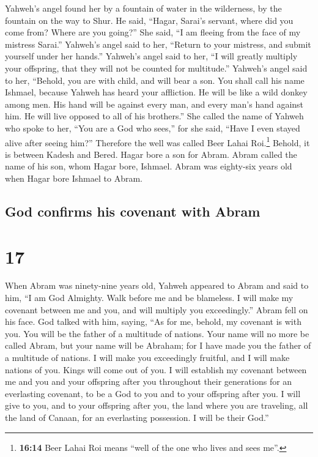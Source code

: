  Yahweh's angel found her by a fountain of water in the
wilderness, by the fountain on the way to Shur.  He said,
``Hagar, Sarai's servant, where did you come from? Where are you
going?'' She said, ``I am fleeing from the face of my mistress Sarai.''
 Yahweh's angel said to her, ``Return to your mistress,
and submit yourself under her hands.''  Yahweh's angel
said to her, ``I will greatly multiply your offspring, that they will
not be counted for multitude.''  Yahweh's angel said to
her, ``Behold, you are with child, and will bear a son. You shall call
his name Ishmael, because Yahweh has heard your affliction.
 He will be like a wild donkey among men. His hand will
be against every man, and every man's hand against him. He will live
opposed to all of his brothers.''  She called the name of
Yahweh who spoke to her, ``You are a God who sees,'' for she said,
``Have I even stayed alive after seeing him?''  Therefore
the well was called Beer Lahai Roi.\footnote{\textbf{16:14} Beer Lahai
  Roi means ``well of the one who lives and sees me''.} Behold, it is
between Kadesh and Bered.  Hagar bore a son for Abram.
Abram called the name of his son, whom Hagar bore, Ishmael.
 Abram was eighty-six years old when Hagar bore Ishmael
to Abram.

\hypertarget{god-confirms-his-covenant-with-abram}{%
\subsection{God confirms his covenant with
Abram}\label{god-confirms-his-covenant-with-abram}}

\hypertarget{section-16}{%
\section{17}\label{section-16}}

 When Abram was ninety-nine years old, Yahweh appeared to
Abram and said to him, ``I am God Almighty. Walk before me and be
blameless.  I will make my covenant between me and you,
and will multiply you exceedingly.''  Abram fell on his
face. God talked with him, saying,  ``As for me, behold,
my covenant is with you. You will be the father of a multitude of
nations.  Your name will no more be called Abram, but your
name will be Abraham; for I have made you the father of a multitude of
nations.  I will make you exceedingly fruitful, and I will
make nations of you. Kings will come out of you.  I will
establish my covenant between me and you and your offspring after you
throughout their generations for an everlasting covenant, to be a God to
you and to your offspring after you.  I will give to you,
and to your offspring after you, the land where you are traveling, all
the land of Canaan, for an everlasting possession. I will be their
God.''

